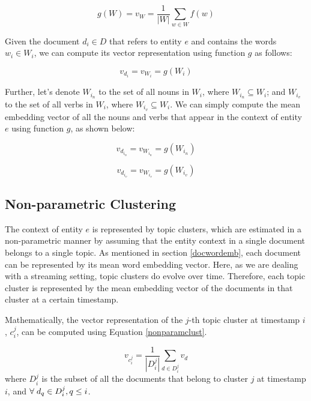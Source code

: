 \documentclass{article}
\begin{document}
\begin{equation}
\label{wordembedding}
g(W) = v_W = \frac{1}{|W|} \sum_{w \in W}{f(w)}
\end{equation}

Given the document $d_i \in D$ that refers to entity $e$ and contains the words $w_i \in W_i$, we can compute its vector representation using function $g$ as follows:

\begin{equation}
\label{wordembedding1}
v_{d_i} = v_{W_i} = g(W_i)
\end{equation}

Further, let's denote $W_{i_n}$ to the set of all nouns in $W_i$, where $W_{i_n} \subseteq W_i$; and $W_{i_v}$ to the set of all verbs in $W_i$, where $W_{i_v} \subseteq W_i$. We can simply compute the mean embedding vector of all the nouns and verbs that appear in the context of entity $e$ using function $g$, as shown below:

\begin{equation*}
\label{nouns}
v_{d_{i_n}} = v_{W_{i_n}} = g(W_{i_n})
\end{equation*}

\begin{equation*}
\label{verbs}
v_{d_{i_v}} = v_{W_{i_v}} = g(W_{i_v})
\end{equation*}

\subsection{Non-parametric Clustering}
\label{non}

The context of entity $e$ is represented by topic clusters, which are estimated in a non-parametric manner by assuming that the entity context in a single document belongs to a single topic. As mentioned in section \ref{docwordemb}, each document can be represented by its mean word embedding vector. Here, as we are dealing with a streaming setting, topic clusters do evolve over time. Therefore, each topic cluster is represented by the mean embedding vector of the documents in that cluster at a certain timestamp.

Mathematically, the vector representation of the $j$-th topic cluster at timestamp $i$, $c^j_i$, can be computed using Equation \ref{nonparamclust}.

\begin{equation}
\label{nonparamclust}
v_{c^j_i} = \frac{1}{|D^j_i|} \sum_{d \in D^j_i}{v_d}
\end{equation}
where $D^j_i$ is the subset of all the documents that belong to cluster $j$ at timestamp $i$, and $\forall\hspace{1mm}d_q \in D^j_i, q \leq i$.
\end{document}
